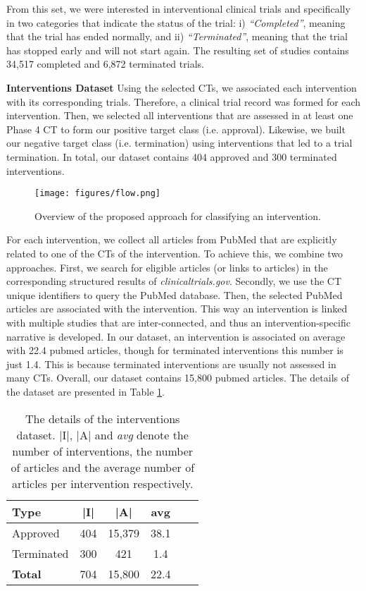 \documentclass[11pt]{article}
\begin{document}
From this set, we were interested in interventional clinical trials and specifically in two categories that indicate the status of the trial: i) \emph{``Completed''}, meaning that the trial has ended normally, and ii) \emph{``Terminated''}, meaning that the trial has stopped early and will not start again. The resulting set of studies contains 34,517 completed and 6,872 terminated trials. 

\textbf{Interventions Dataset}
Using the selected CTs, we associated each intervention with its corresponding trials. Therefore, a clinical trial record was formed for each intervention. Then, we selected all interventions that are assessed in at least one Phase 4 CT to form our positive target class (i.e. approval). Likewise, we built our negative target class (i.e. termination) using interventions that led to a trial termination. In total, our dataset contains 404 approved and 300 terminated interventions.


\begin{figure*}[ht!]
    \centering
    \texttt{[image: figures/flow.png]}
    \caption{Overview of the proposed approach for classifying an intervention.}
    \label{fig:flow}
\end{figure*}

For each intervention, we collect all articles from PubMed that are explicitly related to one of the CTs of the intervention. To achieve this, we combine two approaches. First, we search for eligible articles (or links to articles) in the corresponding structured results of \emph{clinicaltrials.gov}. Secondly, we use the CT unique identifiers to query the PubMed database. Then, the selected PubMed articles are associated with the intervention. This way an intervention is linked with multiple studies that are inter-connected, and thus an intervention-specific narrative is developed. In our dataset, an intervention is associated on average with 22.4 pubmed articles, though for terminated interventions this number is just 1.4. This is because terminated interventions are usually not assessed in many CTs. Overall, our dataset contains 15,800 pubmed articles. The details of the dataset are presented in Table \ref{tab:dataset}. 

\begin{table}[htp]
\centering
\begin{tabular}{lccccc}
\hline
\textbf{Type} &\textbf{|I|} & \textbf{|A|} & \textbf{avg} \\
\hline


Approved & 404 & 15,379 & 38.1\\ 
Terminated & 300 & 421 & 1.4\\ 
\hline
\textbf{Total} & 704 & 15,800 & 22.4\\ 

\hline
\end{tabular}

\caption{The details of the interventions dataset. |I|, |A| and \emph{avg} denote the number of interventions, the number of articles and the average number of articles per intervention respectively.}
\label{tab:dataset}
\end{table}
\end{document}
